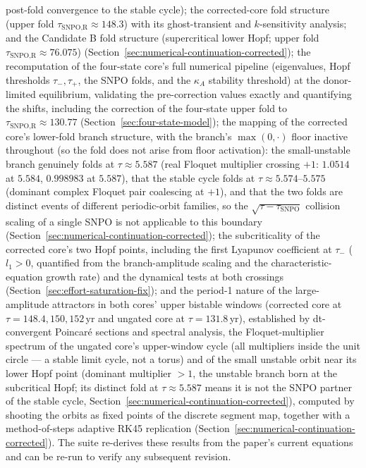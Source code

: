 \documentclass[twocolumn,10pt]{article}
\begin{document}
post-fold convergence to the stable cycle); the corrected-core fold structure (upper fold $\tau_{\text{SNPO,R}}\approx148.3$) with its ghost-transient and $k$-sensitivity analysis; and the Candidate B fold structure (supercritical lower Hopf; upper fold $\tau_{\text{SNPO,R}}\approx76.075$) (Section~\ref{sec:numerical-continuation-corrected}); the recomputation of the four-state core's full numerical pipeline (eigenvalues, Hopf thresholds $\tau_-,\tau_+$, the SNPO folds, and the $\kappa_A$ stability threshold) at the donor-limited equilibrium, validating the pre-correction values exactly and quantifying the shifts, including the correction of the four-state upper fold to $\tau_{\text{SNPO,R}}\approx130.77$ (Section~\ref{sec:four-state-model}); the mapping of the corrected core's lower-fold branch structure, with the branch's $\max(0,\cdot)$ floor inactive throughout (so the fold does not arise from floor activation): the small-unstable branch genuinely folds at $\tau\approx5.587$ (real Floquet multiplier crossing $+1$: $1.0514$ at $5.584$, $0.998983$ at $5.587$), that the stable cycle folds at $\tau\approx5.574$--$5.575$ (dominant complex Floquet pair coalescing at $+1$), and that the two folds are distinct events of different periodic-orbit families, so the $\sqrt{\tau-\tau_{\text{SNPO}}}$ collision scaling of a single SNPO is not applicable to this boundary (Section~\ref{sec:numerical-continuation-corrected}); the subcriticality of the corrected core's two Hopf points, including the first Lyapunov coefficient at $\tau_-$ ($l_1>0$, quantified from the branch-amplitude scaling and the characteristic-equation growth rate) and the dynamical tests at both crossings (Section~\ref{sec:effort-saturation-fix}); and the period-1 nature of the large-amplitude attractors in both cores' upper bistable windows (corrected core at $\tau=148.4,150,152$\,yr and ungated core at $\tau=131.8$\,yr), established by dt-convergent Poincar\'e sections and spectral analysis, the Floquet-multiplier spectrum of the ungated core's upper-window cycle (all multipliers inside the unit circle --- a stable limit cycle, not a torus) and of the small unstable orbit near its lower Hopf point (dominant multiplier $>1$, the unstable branch born at the subcritical Hopf; its distinct fold at $\tau\approx5.587$ means it is not the SNPO partner of the stable cycle, Section~\ref{sec:numerical-continuation-corrected}), computed by shooting the orbits as fixed points of the discrete segment map, together with a method-of-steps adaptive RK45 replication (Section~\ref{sec:numerical-continuation-corrected}). The suite re-derives these results from the paper's current equations and can be re-run to verify any subsequent revision.
\end{document}
